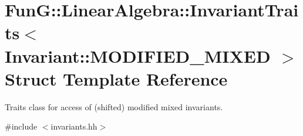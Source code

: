 \hypertarget{structFunG_1_1LinearAlgebra_1_1InvariantTraits_3_01Invariant_1_1MODIFIED__MIXED_01_4}{\section{Fun\-G\-:\-:Linear\-Algebra\-:\-:Invariant\-Traits$<$ Invariant\-:\-:M\-O\-D\-I\-F\-I\-E\-D\-\_\-\-M\-I\-X\-E\-D $>$ Struct Template Reference}
\label{structFunG_1_1LinearAlgebra_1_1InvariantTraits_3_01Invariant_1_1MODIFIED__MIXED_01_4}
}


Traits class for access of (shifted) modified mixed invariants.  




{\ttfamily \#include $<$invariants.\-hh$>$}

